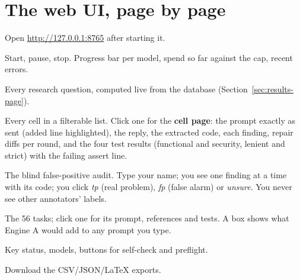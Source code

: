 \documentclass[11pt]{article}
\begin{document}
\section{The web UI, page by page}\label{sec:ui}
Open \url{http://127.0.0.1:8765} after starting it.
\begin{description}[style=nextline, leftmargin=1.2em]
\item[Run] Start, pause, stop. Progress bar per model, spend so far against the cap, recent errors.
\item[Results] Every research question, computed live from the database (Section~\ref{sec:results-page}).
\item[Runs] Every cell in a filterable list. Click one for the \textbf{cell page}: the prompt exactly as sent (added
  line highlighted), the reply, the extracted code, each finding, repair diffs per round, and the four test results
  (functional and security, lenient and strict) with the failing assert line.
\item[Audit] The blind false-positive audit. Type your name; you see one finding at a time with its code; you click
  \emph{tp} (real problem), \emph{fp} (false alarm) or \emph{unsure}. You never see other annotators' labels.
\item[Dataset] The 56 tasks; click one for its prompt, references and tests. A box shows what Engine A would add to
  any prompt you type.
\item[Setup] Key status, models, buttons for self-check and preflight.
\item[Export] Download the CSV/JSON/LaTeX exports.
\end{description}
\end{document}
